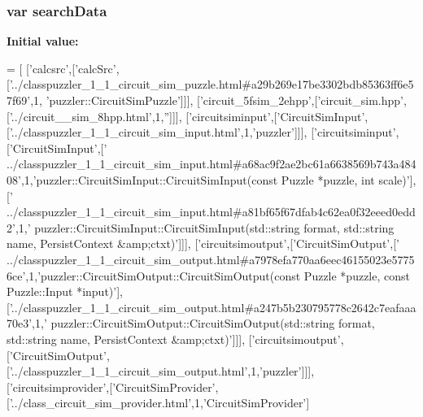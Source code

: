 \subsubsection[{search\+Data}]{\setlength{\rightskip}{0pt plus 5cm}var search\+Data}\label{a00047_ad01a7523f103d6242ef9b0451861231e}
{\bfseries Initial value\+:}
\begin{DoxyCode}
=
[
  [\textcolor{stringliteral}{'calcsrc'},[\textcolor{stringliteral}{'calcSrc'},[\textcolor{stringliteral}{'../classpuzzler\_1\_1\_circuit\_sim\_puzzle.html#a29b269e17be3302bdb85363ff6e57f69'},1,\textcolor{stringliteral}{
      'puzzler::CircuitSimPuzzle'}]]],
  [\textcolor{stringliteral}{'circuit\_5fsim\_2ehpp'},[\textcolor{stringliteral}{'circuit\_sim.hpp'},[\textcolor{stringliteral}{'../circuit\_\_sim\_8hpp.html'},1,\textcolor{stringliteral}{''}]]],
  [\textcolor{stringliteral}{'circuitsiminput'},[\textcolor{stringliteral}{'CircuitSimInput'},[\textcolor{stringliteral}{'../classpuzzler\_1\_1\_circuit\_sim\_input.html'},1,\textcolor{stringliteral}{'puzzler'}]]],
  [\textcolor{stringliteral}{'circuitsiminput'},[\textcolor{stringliteral}{'CircuitSimInput'},[\textcolor{stringliteral}{'
      ../classpuzzler\_1\_1\_circuit\_sim\_input.html#a68ac9f2ae2bc61a6638569b743a48408'},1,\textcolor{stringliteral}{'puzzler::CircuitSimInput::CircuitSimInput(const Puzzle *puzzle, int scale)'}],[\textcolor{stringliteral}{'
      ../classpuzzler\_1\_1\_circuit\_sim\_input.html#a81bf65f67dfab4c62ea0f32eeed0edd2'},1,\textcolor{stringliteral}{'
      puzzler::CircuitSimInput::CircuitSimInput(std::string format, std::string name, PersistContext &amp;ctxt)'}]]],
  [\textcolor{stringliteral}{'circuitsimoutput'},[\textcolor{stringliteral}{'CircuitSimOutput'},[\textcolor{stringliteral}{'
      ../classpuzzler\_1\_1\_circuit\_sim\_output.html#a7978efa770aa6eec46155023e57756ce'},1,\textcolor{stringliteral}{'puzzler::CircuitSimOutput::CircuitSimOutput(const Puzzle *puzzle, const Puzzle::Input
       *input)'}],[\textcolor{stringliteral}{'../classpuzzler\_1\_1\_circuit\_sim\_output.html#a247b5b230795778c2642c7eafaaa70e3'},1,\textcolor{stringliteral}{'
      puzzler::CircuitSimOutput::CircuitSimOutput(std::string format, std::string name, PersistContext &amp;ctxt)'}]]],
  [\textcolor{stringliteral}{'circuitsimoutput'},[\textcolor{stringliteral}{'CircuitSimOutput'},[\textcolor{stringliteral}{'../classpuzzler\_1\_1\_circuit\_sim\_output.html'},1,\textcolor{stringliteral}{'puzzler'}]]],
  [\textcolor{stringliteral}{'circuitsimprovider'},[\textcolor{stringliteral}{'CircuitSimProvider'},[\textcolor{stringliteral}{'../class\_circuit\_sim\_provider.html'},1,\textcolor{stringliteral}{'CircuitSimProvider'}]

\end{DoxyCode}
